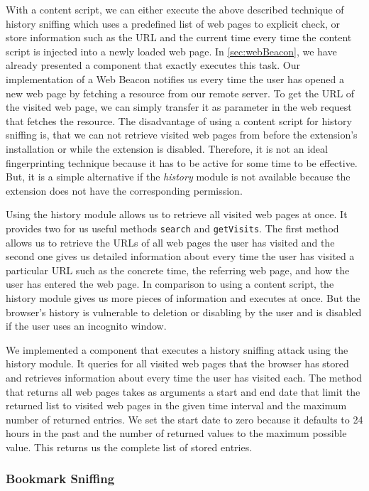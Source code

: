 	With a content script, we can either execute the above described technique of history sniffing which uses a predefined list of web pages to explicit check, or store information such as the URL and the current time every time the content script is injected into a newly loaded web page. In \autoref{sec:webBeacon}, we have already presented a component that exactly executes this task. Our implementation of a Web Beacon notifies us every time the user has opened a new web page by fetching a resource from our remote server. To get the URL of the visited web page, we can simply transfer it as parameter in the web request that fetches the resource. The disadvantage of using a content script for history sniffing is, that we can not retrieve visited web pages from before the extension's installation or while the extension is disabled. Therefore, it is not an ideal fingerprinting technique because it has to be active for some time to be effective. But, it is a simple alternative if the \textit{history} module is not available because the extension does not have the corresponding permission.
	
	Using the history module allows us to retrieve all visited web pages at once. It provides two for us useful methods \texttt{search} and \texttt{getVisits}. The first method allows us to retrieve the URLs of all web pages the user has visited and the second one gives us detailed information about every time the user has visited a particular URL such as the concrete time, the referring web page, and how the user has entered the web page. In comparison to using a content script, the history module gives us more pieces of information and executes at once. But the browser's history is vulnerable to deletion or disabling by the user and is disabled if the user uses an incognito window.
	
	We implemented a component that executes a history sniffing attack using the history module. It queries for all visited web pages that the browser has stored and retrieves information about every time the user has visited each. The method that returns all web pages takes as arguments a start and end date that limit the returned list to visited web pages in the given time interval and the maximum number of returned entries. We set the start date to zero because it defaults to 24 hours in the past and the number of returned values to the maximum possible value. This returns us the complete list of stored entries.
	
\subsubsection{Bookmark Sniffing}
\label{sec:bookmarkSniffing}

